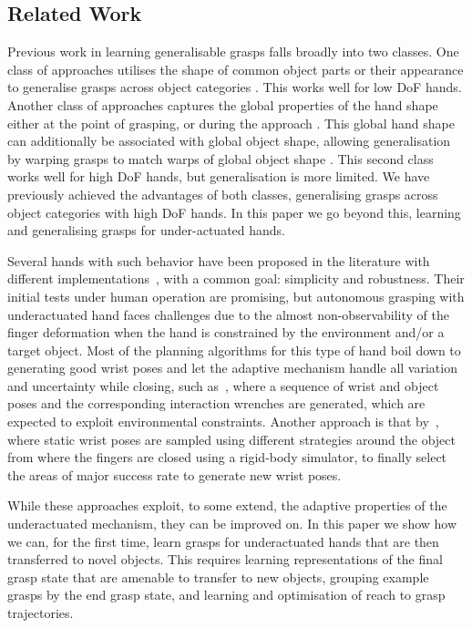 
\subsection{Related Work}
Previous work in learning generalisable grasps falls broadly into two classes. One class of approaches utilises the shape of common object parts or their appearance to generalise grasps across object categories \cite{saxena2008b,detry2013a,herzog2014a, kroemer2012a}. This works well for low DoF hands. Another class of approaches captures the global properties of the hand shape either at the point of grasping, or during the approach \cite{ben2012generalization}. This global hand shape can additionally be associated with global object shape, allowing generalisation by warping grasps to match warps of global object shape \cite{hillenbrand2012transferring}. This second class works well for high DoF hands, but generalisation is more limited. We have previously achieved the advantages of both classes, generalising grasps across object categories with high DoF hands. In this paper we go beyond this, learning and generalising grasps for under-actuated hands.

Several hands with such behavior have been proposed in the literature with different implementations~\cite{Catalano2014Adaptive, Dollar2010Highly}, with a common goal: simplicity and robustness. Their initial tests under human operation are promising, but autonomous grasping with underactuated hand faces challenges due to the almost non-observability of the finger deformation when the hand is constrained by the environment and/or a target object. Most of the planning algorithms for this type of hand boil down to generating good wrist poses and let the adaptive mechanism handle all variation and uncertainty while closing, such as~\cite{Eppner2015Planning}, where a sequence of wrist and object poses and the corresponding interaction wrenches are generated, which are expected to exploit environmental constraints. Another approach is that by~\cite{Bonilla2014Grasping,Bonilla2015Grasp}, where static wrist poses are sampled using different strategies around the object from where the fingers are closed using a rigid-body simulator, to finally select the areas of major success rate to generate new wrist poses.

While these approaches exploit, to some extend, the adaptive properties of the underactuated mechanism, they can be improved on. In this paper we show how we can, for the first time, learn grasps for underactuated hands that are then transferred to novel objects. This requires learning representations of the final grasp state that are amenable to transfer to new objects, grouping example grasps by the end grasp state, and learning and optimisation of reach to grasp trajectories.
